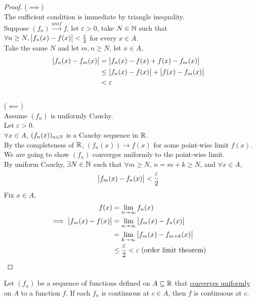 \documentclass[11pt]{article}
\begin{document}
	\begin{proof}
		($\implies$)\\
		The sufficient condition is immediate by triangle inequality. \\
		Suppose $(f_n) \overset{unif}{\to} f$, let $\varepsilon > 0$, take $N \in \mathbb{N}$ such that $\forall n \geq N, \big \vert {f_n(x) - f(x)} \big \vert < \frac{\varepsilon}{2}$ for every $x \in A$. \\
		Take the same $N$ and let $m, n \geq N$, let $x \in A$,
		\begin{align}
			\big \vert {f_n(x) - f_m(x)} \big \vert &= \big \vert {f_n(x) - f(x) + f(x) - f_m(x)} \big \vert \\
			&\leq \big \vert {f_n(x) - f(x)} \big \vert + \big \vert {f(x) - f_m(x)} \big \vert \\
			&<\varepsilon
		\end{align} \\
		($\impliedby$) \\
		Assume $(f_n)$ is uniformly Cauchy. \\
		Let $\varepsilon > 0$. \\
		$\forall x \in A$, $(f_n(x))_{n \in \mathbb{N}}$ is a Cauchy sequence in $\mathbb{R}$. \\
		By the completeness of $\mathbb{R}$, $(f_n(x)) \to f(x)$ for some point-wise limit $f(x)$. \\
		We are going to show $(f_n)$ converges uniformly to the point-wise limit. \\
		By uniform Cauchy, $\exists N \in \mathbb{N}$ such that $\forall m \geq N$, $n = m+k \geq N$, and $\forall x \in A$,
		\begin{align}
			\big \vert {f_m(x) - f_n(x)} \big \vert < \frac{\varepsilon}{2}
		\end{align}
		Fix $x \in A$,
		\begin{align}
			f(x) &= \lim_{n \to \infty} f_n(x) \\
			\implies \big \vert {f_m(x) - f(x)} \big \vert &= \lim_{n \to \infty} \big \vert {f_m(x) - f_n(x)} \big \vert \\
			&= \lim_{k \to \infty} \big \vert {f_m(x) - f_{m+k}(x)} \big \vert \\
			&\leq \frac{\varepsilon}{2} < \varepsilon \text{{ (order limit theorem)}}
		\end{align}
	\end{proof}
	
	\begin{theorem}
		Let $(f_n)$ be a sequence of functions defined on $A \subseteq \mathbb{R}$ that \ul{converges uniformly} on $A$ to a function $f$. If each $f_n$ is continuous at $c \in A$, then $f$ is continuous at $c$.
	\end{theorem}
	
\end{document}
